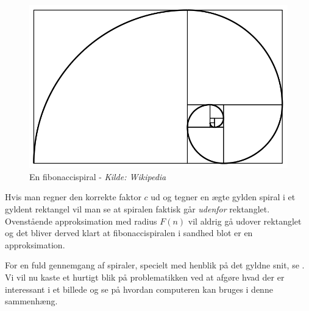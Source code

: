 {\begin{figure}[h!]
	\begin{center}
		\includegraphics[scale=0.35,angle=0]{afsnit/baggrund/billeder/Fibonacci_spiral}
	\end{center}
	\caption[En fibonaccispiral]{En fibonaccispiral - \emph{Kilde: Wikipedia}}
	\label{fibonacci_spiral}
\end{figure}
Hvis man regner den korrekte faktor $c$ ud og tegner en ægte gylden
spiral i et gyldent rektangel vil man se at spiralen faktisk går
\emph{udenfor} rektanglet\cite{Sharp2002}. Ovenstående approksimation
med radius $F(n)$ vil aldrig gå udover rektanglet og det bliver derved
klart at fibonaccispiralen i sandhed blot er en approksimation.

For en fuld gennemgang af spiraler, specielt med henblik på det gyldne
snit, se \cite{Sharp2002}. Vi vil nu kaste et hurtigt blik på
problematikken ved at afgøre hvad der er interessant i et billede og se
på hvordan computeren kan bruges i denne sammenhæng.

}
